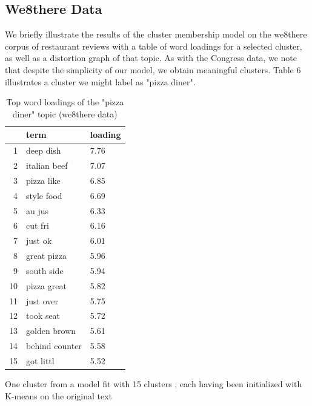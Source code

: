 \documentclass[12pt]{article}
\begin{document}
\subsection{We8there Data}

We briefly illustrate the results of the cluster membership model on the we8there corpus of restaurant reviews with a table of word loadings for a selected cluster, as well as a distortion graph of that topic. 
As with the Congress data, we note that despite the simplicity of our model, we obtain meaningful clusters. Table 6 illustrates a cluster we might label as "pizza diner". 


\begin{table}[ht]
\centering
\begin{threeparttable}
\caption{Top word loadings of the "pizza diner" topic (we8there data)}
\begin{tabular}{rll}
  \hline
 & term & loading \\ 
  \hline
1 & deep dish & 7.76 \\ 
  2 & italian beef & 7.07 \\ 
  3 & pizza like & 6.85 \\ 
  4 & style food & 6.69 \\ 
  5 & au jus & 6.33 \\ 
  6 & cut fri & 6.16 \\ 
  7 & just ok & 6.01 \\ 
  8 & great pizza & 5.96 \\ 
  9 & south side & 5.94 \\ 
  10 & pizza great & 5.82 \\ 
  11 & just over & 5.75 \\ 
  12 & took seat & 5.72 \\ 
  13 & golden brown & 5.61 \\ 
  14 & behind counter & 5.58 \\ 
  15 & got littl & 5.52 \\ 
   \hline
\end{tabular}
\begin{tablenotes}
\small
\item One cluster from a model fit with 15 clusters , each having been initialized with K-means on the original text
\end{tablenotes}
\end{threeparttable}
\end{table}
\end{document}
